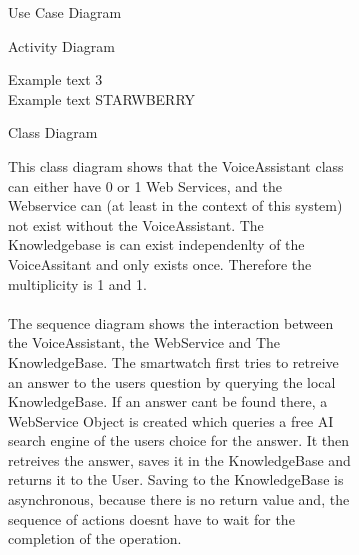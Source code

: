 \documentclass{article}
\begin{document}
	\begin{figure}[htbp]
		\centering
		\begin{subfigure}{\textwidth}
			\centering
			\scalebox{0.7}{}
			\caption{Use Case Diagram}
		\end{subfigure}
		\begin{subfigure}{\textwidth}
			
		\end{subfigure}
	\end{figure}
	
	\begin{figure}[htbp]
		\centering
		\begin{subfigure}{\textwidth}
			\centering
			\scalebox{0.7}{}
			\caption{Activity Diagram}
		\end{subfigure}
		\begin{subfigure}{\textwidth}
			Example text 3 \\
			Example text STARWBERRY 
		\end{subfigure}
	\end{figure}
\newpage
	
\begin{figure}[htbp]
		\centering
		\begin{subfigure}{\textwidth}
			\centering
			\scalebox{0.8}{}
			\caption{Class Diagram}
		\end{subfigure}
		\begin{subfigure}{\textwidth}
			This class diagram shows that the VoiceAssistant class can either have 0 or 1 Web Services, and the Webservice can (at least in the context of this system)
			not exist without the VoiceAssistant. The Knowledgebase is can exist independenlty of the VoiceAssitant and only exists once. Therefore the multiplicity is 1 and 1.
			\\ \\
			The sequence diagram shows the interaction between the VoiceAssistant, the WebService and The KnowledgeBase. 
			The smartwatch first tries to retreive an answer to the users question by querying the local KnowledgeBase.
			If an answer cant be found there, a WebService Object is created which queries a free AI search engine of the users choice for the answer.
			It then retreives the answer, saves it in the KnowledgeBase and returns it to the User. Saving to the KnowledgeBase is asynchronous,
			because there is no return value and, the sequence of actions doesnt have to wait for the completion of the operation.
		\end{subfigure}
	\end{figure}
\newpage
	
\end{document}
